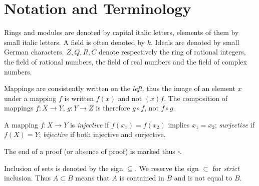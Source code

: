 \section*{Notation and Terminology}

Rings and modules are denoted by capital italic letters, elements of them by small italic letters. A field is often denoted by \(k\). Ideals are denoted by small German characters. \(Z, Q, R, C\) denote respectively the ring of rational integers, the field of rational numbers, the field of real numbers and the field of complex numbers.

Mappings are consistently written on the \emph{left}, thus the image of an element \(x\) under a mapping \(f\) is written \(f(x)\) and not \((x)f\). The composition of mappings \(f\colon X \to Y\), \(g\colon Y \to Z\) is therefore \(g\circ f\), not \(f\circ g\).

A mapping \(f\colon X \to Y\) is \emph{injective} if \(f(x_1)=f(x_2)\) implies \(x_1=x_2\); \emph{surjective} if \(f(X)=Y\); \emph{bijective} if both injective and surjective.

The end of a proof (or absence of proof) is marked thus \(\square\).

Inclusion of sets is denoted by the sign \(\subseteq\). We reserve the sign \(\subset\) for \emph{strict} inclusion. Thus \(A\subset B\) means that \(A\) is contained in \(B\) and is not equal to \(B\).
